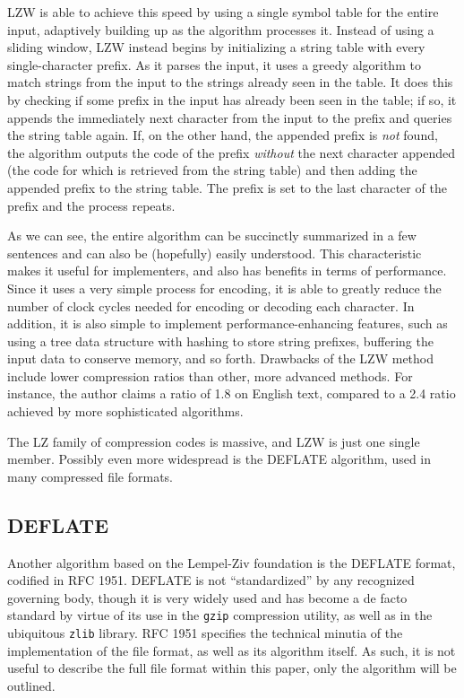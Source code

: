 \documentclass[12pt]{article}
\begin{document}
LZW is able to achieve this speed by using a single symbol table for
the entire input, adaptively building up as the algorithm processes
it. Instead of using a sliding window, LZW instead begins by
initializing a string table with every single-character prefix. As it
parses the input, it uses a greedy algorithm to match strings from the
input to the strings already seen in the table. It does this by
checking if some prefix in the input has already been seen in the
table; if so, it appends the immediately next character from the input
to the prefix and queries the string table again. If, on the other
hand, the appended prefix is \emph{not} found, the algorithm outputs
the code of the prefix \emph{without} the next character appended (the
code for which is retrieved from the string table) and then adding the
appended prefix to the string table. The prefix is set to the last
character of the prefix and the process repeats.

As we can see, the entire algorithm can be succinctly summarized in a
few sentences and can also be (hopefully) easily understood. This
characteristic makes it useful for implementers, and also has benefits
in terms of performance. Since it uses a very simple process for
encoding, it is able to greatly reduce the number of clock cycles
needed for encoding or decoding each character. In addition, it is
also simple to implement performance-enhancing features, such as using
a tree data structure with hashing to store string prefixes, buffering
the input data to conserve memory, and so forth. Drawbacks of the LZW
method include lower compression ratios than other, more advanced
methods. For instance, the author claims a ratio of 1.8 on English
text, compared to a 2.4 ratio achieved by more sophisticated
algorithms. \cite{LempelZivWelch}

The LZ family of compression codes is massive, and LZW is just one
single member. Possibly even more widespread is the DEFLATE algorithm,
used in many compressed file formats.

\subsection{DEFLATE}

Another algorithm based on the Lempel-Ziv foundation is the DEFLATE
format, codified in RFC 1951. \cite{RFC1951} DEFLATE is not
``standardized'' by any recognized governing body, though it is very
widely used and has become a de facto standard by virtue of its use in
the \texttt{gzip} compression utility, as well as in the ubiquitous
\texttt{zlib} library. RFC 1951 specifies the technical minutia of the
implementation of the file format, as well as its algorithm itself. As
such, it is not useful to describe the full file format within this
paper, only the algorithm will be outlined.
\end{document}
